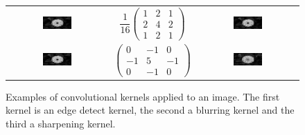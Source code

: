 \begin{description}
\begin{figure}
\begin{tabular}{ccc}
                \includegraphics[width=0.3\textwidth]{./pictures/method/original_convolution.png} &
                \begin{minipage}{6cm}
                    \begin{equation*}
                        \frac{1}{16}\begin{pmatrix}
                            1 & 2 & 1 \\
                            2 & 4 & 2  \\
                            1 & 2 & 1
                        \end{pmatrix}
                    \end{equation*}
                \end{minipage}
                    &
                \includegraphics[width=0.3\textwidth]{./pictures/method/blurred_convolution.png} \\

                \includegraphics[width=0.3\textwidth]{./pictures/method/original_convolution.png} &
                \begin{minipage}{6cm}
                    \begin{equation*}
                        \begin{pmatrix}
                            0  & -1 & 0  \\
                            -1 & 5  & -1 \\
                            0  & -1 & 0
                        \end{pmatrix}
                    \end{equation*}
                \end{minipage}
                    &
                \includegraphics[width=0.3\textwidth]{./pictures/method/sharpened_convolution.png}
            \end{tabular}
            \caption{Examples of convolutional kernels applied to an image. The
                first kernel is an edge detect kernel, the second a blurring
                kernel and the third a sharpening kernel.}
            \label{fig:convolution_example}
        \end{figure}


\end{description}
